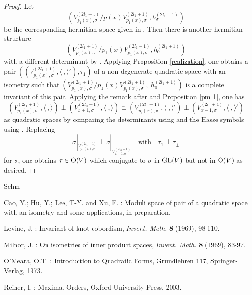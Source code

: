 \documentclass[12pt]{amsart}
\begin{document}
\begin{proof}
 Let $$(V_{p_1(x), \sigma}^{(2l_1+1)}/p(x)V_{p_1(x), \sigma}^{(2l_1+1)}, h_\sigma^{(2l_1+1)})$$ be the corresponding hermitian space given in \cite[Theorem 3.3]{Mil}. Then  there is another hermitian structure
$$(V_{p_1(x), \sigma}^{(2l_1+1)} / p_1(x) V_{p_1(x), \sigma}^{(2l_1+1)} ,  h_0^{(2l_1+1)} )$$
with a different determinant by \cite[Example 3, \S 1]{Mil}.  Applying Proposition \ref{realization}, one obtains a pair $((V_{p_1(x), \sigma}^{(2l_1+1)} , \langle \ , \rangle '), \tau_1)$ of a non-degenerate quadratic space with an isometry such that $(V_{p_1(x), \sigma}^{(2l_1+1)} / p_1(x) V_{p_1(x), \sigma}^{(2l_1+1)} , \ h_0^{(2l_1+1)} )$ is a complete invariant of this pair.
Applying the remark after \cite[Theorem 3.3]{Mil} and Proposition \ref{pm 1}, one has
$$ (V_{p_1(x), \sigma}^{(2l_1+1)}, \langle \ , \rangle) \perp (V_{x\pm 1, \sigma}^{(2l_0+1)}, \langle \ , \rangle) \cong (V_{p_1(x), \sigma}^{(2l_1+1)}, \langle \ , \rangle') \perp (V_{x\pm 1, \sigma}^{(2l_0+1)}, \langle \ , \rangle') $$ as quadratic spaces by comparing the determinants using \cite[Theorem 2.7]{Mil} and the Hasse symbols using \cite[58:3 Remark]{OM}.  
 Replacing $$\sigma |_{V_{p_1(x), \sigma}^{(2l_1+1)}} \perp \sigma |_{V_{x\pm 1, \sigma}^{(2l_0+1)}} \ \ \ \text{ with } \ \ \ \tau_1\perp \tau_{\pm}$$ for $\sigma$, one obtains $\tau\in {\rm O}(V)$  which conjugate to $\sigma$ in ${\rm GL}(V)$ but not in ${\rm O}(V)$ as desired.
\end{proof}


\begin{thebibliography}{Schm}


 Cao, Y.; Hu, Y.; Lee, T-Y. and Xu, F. : Moduli space of pair of a quadratic space with an isometry and some applications, in preparation. 


 Levine, J. : Invariant of knot cobordism, {\it Invent. Math.}  {\bf 8} (1969), 98-110.


  Milnor, J. :  On isometries of inner product spaces,  {\it Invent. Math. } {\bf 8} (1969), 83-97. 

  O'Meara,  O.T. :  Introduction to Quadratic Forms,  Grundlehren 117,  Springer-Verlag, 1973.


    Reiner,  I. :  Maximal Orders,  Oxford University Press, 2003. 

\end{thebibliography}
\end{document}
